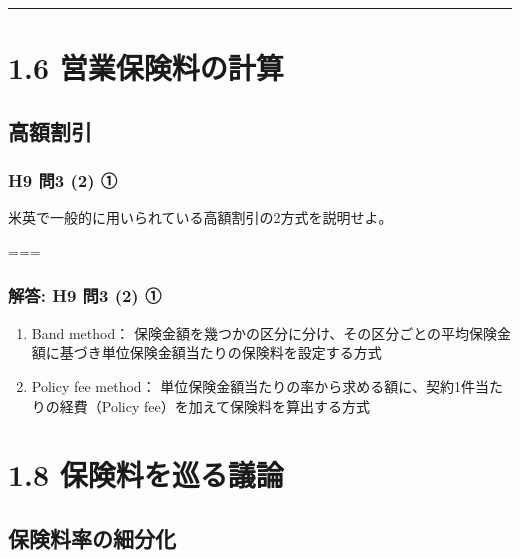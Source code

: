 \documentclass[]{article}
\begin{document}
\begin{center}\rule{0.5\linewidth}{0.5pt}\end{center}

\hypertarget{ux55b6ux696dux4fddux967aux6599ux306eux8a08ux7b97}{%
\section{1.6
営業保険料の計算}\label{ux55b6ux696dux4fddux967aux6599ux306eux8a08ux7b97}}

\hypertarget{ux9ad8ux984dux5272ux5f15}{%
\subsection{高額割引}\label{ux9ad8ux984dux5272ux5f15}}

\hypertarget{h9-ux554f3-2-ux2460}{%
\subsubsection{H9 問3 (2) ①}\label{h9-ux554f3-2-ux2460}}

米英で一般的に用いられている高額割引の2方式を説明せよ。

===

\hypertarget{ux89e3ux7b54-h9-ux554f3-2-ux2460}{%
\subsubsection{解答: H9 問3 (2)
①}\label{ux89e3ux7b54-h9-ux554f3-2-ux2460}}

\begin{enumerate}
\def\labelenumi{\arabic{enumi}.}
\tightlist
\item
  Band method：
  保険金額を幾つかの区分に分け、その区分ごとの平均保険金額に基づき単位保険金額当たりの保険料を設定する方式
\item
  Policy fee method：
  単位保険金額当たりの率から求める額に、契約1件当たりの経費（Policy
  fee）を加えて保険料を算出する方式
\end{enumerate}

\hypertarget{ux4fddux967aux6599ux3092ux5de1ux308bux8b70ux8ad6}{%
\section{1.8
保険料を巡る議論}\label{ux4fddux967aux6599ux3092ux5de1ux308bux8b70ux8ad6}}

\hypertarget{ux4fddux967aux6599ux7387ux306eux7d30ux5206ux5316}{%
\subsection{保険料率の細分化}\label{ux4fddux967aux6599ux7387ux306eux7d30ux5206ux5316}}
\end{document}
